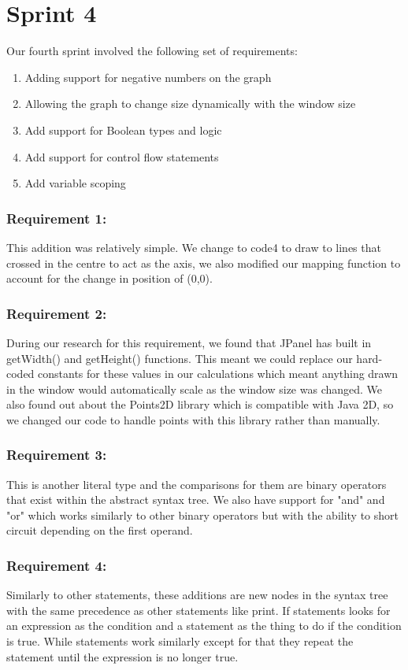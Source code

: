 \documentclass[a4paper, oneside, 11pt]{report}
\begin{document}
\section{Sprint 4}
Our fourth sprint involved the following set of requirements:
\begin{enumerate}
\item Adding support for negative numbers on the graph
\item Allowing the graph to change size dynamically with the window size
\item Add support for Boolean types and logic
\item Add support for control flow statements
\item Add variable scoping
\end{enumerate}

\subsubsection{Requirement 1:}
This addition was relatively simple. We change to code4 to draw to lines that crossed in the centre to act as the axis, we also modified our mapping function to account for  the change in position of (0,0).
\subsubsection{Requirement 2:}
During our research for this requirement, we found that JPanel has built in getWidth() and getHeight() functions. This meant we could replace our hard-coded constants for these values in our calculations which meant anything drawn in the window would automatically scale as the window size was changed.
We also found out about the Points2D library which is compatible with Java 2D, so we changed our code to handle points with this library rather than manually.
\subsubsection{Requirement 3:}
This is another literal type and the comparisons for them are binary operators that exist within the abstract syntax tree. We also have support for "and" and "or" which works similarly to other binary operators but with the ability to short circuit depending on the first operand.
\subsubsection{Requirement 4:}
Similarly to other statements, these additions are new nodes in the syntax tree with the same precedence as other statements like print. If statements looks for an expression as the condition and a statement as the thing to do if the condition is true. While statements work similarly except for that they repeat the statement until the expression is no longer true.
\end{document}
